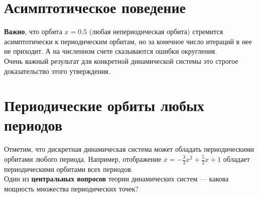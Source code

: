 \section{Асимптотическое поведение}
\textbf{Важно}, что орбита \(x = 0.5\) (любая непериодическая орбита) стремится асимптотически к периодическим орбитам, но за конечное число итераций в нее не приходит.
А на численном счете сказываются ошибки округления.
\\[2mm]
Очень важный результат для конкретной динамической системы это строгое доказательство этого утверждения. 

\section{Периодические орбиты любых периодов}
Отметим, что дискретная динамическая система может обладать периодическими орбитами любого периода.
Например, отображение \(\overline{x} = -\frac{3}{2}x^2 + \frac{5}{2}x + 1\) обладает периодическими орбитами всех периодов.
\\[2mm]
Один из \textbf{центральных вопросов} теории динамических систем --- какова мощность множества периодических точек?

